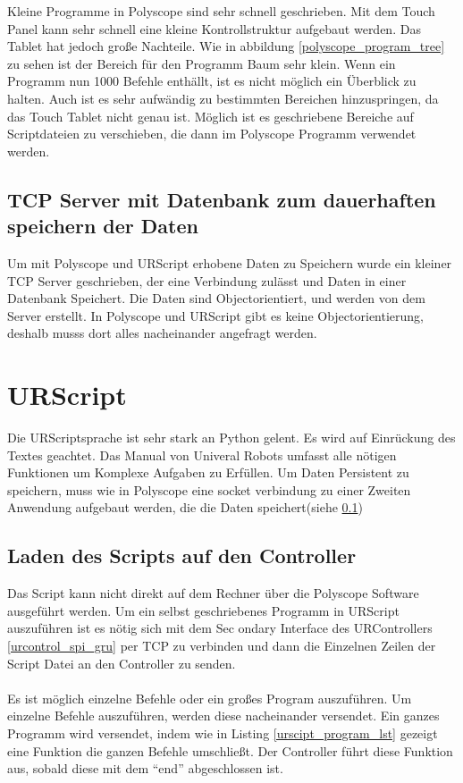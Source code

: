 Kleine Programme in Polyscope sind sehr schnell geschrieben. Mit dem Touch Panel kann sehr schnell eine kleine Kontrollstruktur aufgebaut werden. Das Tablet hat jedoch große Nachteile. Wie in abbildung \ref{polyscope_program_tree} zu sehen ist der Bereich für den Programm Baum sehr klein. Wenn ein Programm nun 1000 Befehle enthällt, ist es nicht möglich ein Überblick zu halten. Auch ist es sehr aufwändig zu bestimmten Bereichen hinzuspringen, da das Touch Tablet nicht genau ist. Möglich ist es geschriebene Bereiche auf Scriptdateien zu verschieben, die dann im Polyscope Programm verwendet werden. 

\subsection{TCP Server mit Datenbank zum dauerhaften speichern der Daten}
\label{tcp_datentank_sicherung_rel}

Um mit Polyscope und URScript erhobene Daten zu Speichern wurde ein kleiner TCP Server geschrieben, der eine Verbindung zulässt und Daten in einer Datenbank Speichert. Die Daten sind Objectorientiert, und werden von dem Server erstellt. 
In Polyscope und URScript gibt es keine Objectorientierung, deshalb musss dort alles nacheinander angefragt werden. 

\section{URScript}
\label{sec:ur_script_rel}

Die URScriptsprache ist sehr stark an Python gelent. Es wird auf Einrückung des Textes geachtet.
Das Manual von Univeral Robots umfasst alle nötigen Funktionen um Komplexe Aufgaben zu Erfüllen.
Um Daten Persistent zu speichern, muss wie in Polyscope eine socket verbindung zu einer Zweiten Anwendung aufgebaut werden, die die Daten speichert(siehe \ref{tcp_datentank_sicherung_rel})

\subsection{Laden des Scripts auf den Controller}
\label{load_script_rel}

Das Script kann nicht direkt auf dem Rechner über die Polyscope Software ausgeführt werden. Um ein selbst geschriebenes Programm in URScript auszuführen ist es nötig sich mit dem Sec
ondary Interface des URControllers \ref{urcontrol_spi_gru} per TCP zu verbinden und dann die Einzelnen Zeilen der Script Datei an den Controller zu senden.
\\\\
Es ist möglich einzelne Befehle oder ein großes Program auszuführen. Um einzelne Befehle auszuführen, werden diese nacheinander versendet.
Ein ganzes Programm wird versendet, indem wie in Listing \ref{urscipt_program_lst} gezeigt eine Funktion die ganzen Befehle umschließt. Der Controller führt diese Funktion aus, sobald diese mit dem ``end'' abgeschlossen ist.

